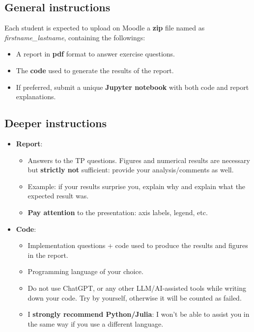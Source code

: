 \subsection*{General instructions}
\fontsize{11}{13}\selectfont
Each student is expected to upload on Moodle a \textbf{zip} file named as \textit{firstname\_lastname}, containing the followings: 

\begin{itemize}
    \item A report in \textbf{pdf} format to answer exercise questions.
    \item The \textbf{code} used to generate the results of the report. 
    \item If preferred, submit a unique \textbf{Jupyter notebook} with both code and report explanations.
\end{itemize}

\subsection*{Deeper instructions}
\begin{itemize}
    \item \textbf{Report}: 
    \begin{itemize}
    \item Answers to the TP questions. Figures and numerical results are necessary but \textbf{strictly not} sufficient: provide your analysis/comments as well.
    \item Example: if your results surprise you, explain why and explain what the expected result was. 
    \item \textbf{Pay attention} to the presentation: axis labels, legend, etc. 
    \end{itemize}
    \item \textbf{Code}: 
    \begin{itemize}
        \item Implementation questions + code used to produce the results and figures in the report. 
        \item Programming language of your choice.
        \item Do not use ChatGPT, or any other LLM/AI-assisted tools while writing down your code. Try by yourself, otherwise it will be counted as failed.
        \item I \textbf{strongly recommend Python/Julia}: I won't be able to assist you in the same way if you use a different language.
    \end{itemize}
\end{itemize}